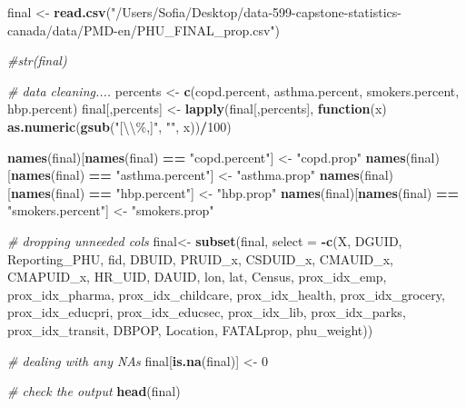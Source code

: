 \documentclass[]{article}
\newenvironment{Shaded}{\begin{snugshade}}{\end{snugshade}}
\newcommand{\CharTok}[1]{\textcolor[rgb]{0.31,0.60,0.02}{#1}}
\newcommand{\CommentTok}[1]{\textcolor[rgb]{0.56,0.35,0.01}{\textit{#1}}}
\newcommand{\ControlFlowTok}[1]{\textcolor[rgb]{0.13,0.29,0.53}{\textbf{#1}}}
\newcommand{\DataTypeTok}[1]{\textcolor[rgb]{0.13,0.29,0.53}{#1}}
\newcommand{\DecValTok}[1]{\textcolor[rgb]{0.00,0.00,0.81}{#1}}
\newcommand{\KeywordTok}[1]{\textcolor[rgb]{0.13,0.29,0.53}{\textbf{#1}}}
\newcommand{\NormalTok}[1]{#1}
\newcommand{\OperatorTok}[1]{\textcolor[rgb]{0.81,0.36,0.00}{\textbf{#1}}}
\newcommand{\StringTok}[1]{\textcolor[rgb]{0.31,0.60,0.02}{#1}}
\begin{document}
\begin{Shaded}
\begin{Highlighting}[]
\NormalTok{final \textless{}{-}}\StringTok{ }\KeywordTok{read.csv}\NormalTok{(}\StringTok{"/Users/Sofia/Desktop/data{-}599{-}capstone{-}statistics{-}canada/data/PMD{-}en/PHU\_FINAL\_prop.csv"}\NormalTok{)}

\CommentTok{\#str(final)}


\CommentTok{\# data cleaning....}
\NormalTok{percents \textless{}{-}}\StringTok{ }\KeywordTok{c}\NormalTok{(}\StringTok{\textquotesingle{}copd.percent\textquotesingle{}}\NormalTok{, }\StringTok{\textquotesingle{}asthma.percent\textquotesingle{}}\NormalTok{, }\StringTok{\textquotesingle{}smokers.percent\textquotesingle{}}\NormalTok{, }\StringTok{\textquotesingle{}hbp.percent\textquotesingle{}}\NormalTok{)}
\NormalTok{final[,percents] \textless{}{-}}\StringTok{ }\KeywordTok{lapply}\NormalTok{(final[,percents], }\ControlFlowTok{function}\NormalTok{(x) }\KeywordTok{as.numeric}\NormalTok{(}\KeywordTok{gsub}\NormalTok{(}\StringTok{"[}\CharTok{\textbackslash{}\textbackslash{}}\StringTok{\%,]"}\NormalTok{, }\StringTok{""}\NormalTok{, x))}\OperatorTok{/}\DecValTok{100}\NormalTok{)}

\KeywordTok{names}\NormalTok{(final)[}\KeywordTok{names}\NormalTok{(final) }\OperatorTok{==}\StringTok{ "copd.percent"}\NormalTok{] \textless{}{-}}\StringTok{ "copd.prop"}
\KeywordTok{names}\NormalTok{(final)[}\KeywordTok{names}\NormalTok{(final) }\OperatorTok{==}\StringTok{ "asthma.percent"}\NormalTok{] \textless{}{-}}\StringTok{ "asthma.prop"}
\KeywordTok{names}\NormalTok{(final)[}\KeywordTok{names}\NormalTok{(final) }\OperatorTok{==}\StringTok{ "hbp.percent"}\NormalTok{] \textless{}{-}}\StringTok{ "hbp.prop"}
\KeywordTok{names}\NormalTok{(final)[}\KeywordTok{names}\NormalTok{(final) }\OperatorTok{==}\StringTok{ "smokers.percent"}\NormalTok{] \textless{}{-}}\StringTok{ "smokers.prop"}

\CommentTok{\# dropping unneeded cols}
\NormalTok{final\textless{}{-}}\StringTok{ }\KeywordTok{subset}\NormalTok{(final, }\DataTypeTok{select =} \OperatorTok{{-}}\KeywordTok{c}\NormalTok{(X, DGUID, Reporting\_PHU, fid, DBUID, PRUID\_x, CSDUID\_x, CMAUID\_x, CMAPUID\_x, HR\_UID, DAUID, lon, lat, Census, prox\_idx\_emp, prox\_idx\_pharma, prox\_idx\_childcare, prox\_idx\_health, prox\_idx\_grocery, prox\_idx\_educpri, prox\_idx\_educsec, prox\_idx\_lib, prox\_idx\_parks, prox\_idx\_transit, DBPOP, Location, FATALprop, phu\_weight))}
 
\CommentTok{\# dealing with any NA\textquotesingle{}s}
\NormalTok{final[}\KeywordTok{is.na}\NormalTok{(final)] \textless{}{-}}\StringTok{ }\DecValTok{0}

\CommentTok{\# check the output}
\KeywordTok{head}\NormalTok{(final)}
\end{Highlighting}
\end{Shaded}
\end{document}
